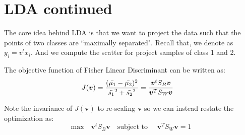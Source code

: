 \newpage
\section{LDA continued}
The core idea behind LDA is that we want to project the data such that the points of two classes are ``maximally separated".
Recall that, we denote  as $y_i = v^t x_i$. And we compute the scatter for project samples of class 1 and 2. 
\begin{definition}
    The objective function of Fisher Linear Discriminant can be written as:
    \begin{align*}
        J(\boldsymbol{v}) &= \frac{(\Tilde{\mu_1} - \Tilde{\mu_2})^2}{\Tilde{s_1}^2  + \Tilde{s_2}^2} 
        = \frac{\boldsymbol{v}^t S_B \boldsymbol{v}}{\boldsymbol{v}^T S_W \boldsymbol{v}}
    \end{align*}
\end{definition}
    Note the invariance of $J(\boldsymbol{v})$ to re-scaling $\boldsymbol{v}$ so we can instead restate the optimization as:
    $$
    \text{max} \quad \boldsymbol{v}^t S_B \boldsymbol{v} \quad \text{subject to } 
    \quad \boldsymbol{v}^T S_W \boldsymbol{v} = 1
    $$